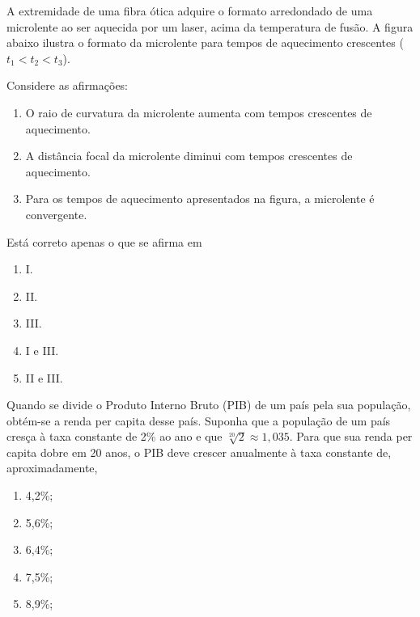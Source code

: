 \documentclass[twocolumn,landscape]{amsart}
\begin{document}
\begin{questao}
  A extremidade de uma fibra ótica adquire o formato arredondado de uma
  microlente ao ser aquecida por um laser, acima da temperatura de
  fusão. A figura abaixo ilustra o formato da microlente para tempos de
  aquecimento crescentes ($t_1<t_2<t_3$).

  Considere as afirmações:

  \begin{enumerate}[\bf I.]
    \item O raio de curvatura da microlente aumenta com
    tempos crescentes de aquecimento.
    \item A distância focal da microlente diminui com tempos
    crescentes de aquecimento.
    \item Para os tempos de aquecimento apresentados na
    figura, a microlente é convergente.
  \end{enumerate}

  Está correto apenas o que se afirma em

  \begin{enumerate}[\bf a.]
    \item I.
    \item II.
    \item III.
    \item I e III.
    \item II e III. %
  \end{enumerate}
\end{questao}
\clearpage

\begin{questao}
  Quando se divide o Produto Interno Bruto (PIB) de um país pela sua
  população, obtém-se a renda per capita desse país. Suponha que a
  população de um país cresça à taxa constante de 2\% ao ano e que
  $\sqrt[20]{2}\approx 1,035$. Para que sua renda per capita dobre em 20
  anos, o PIB deve crescer anualmente à taxa constante de,
  aproximadamente,
  \begin{enumerate}[\bf a.]
    \item 4,2\%;
    \item 5,6\%; %
    \item 6,4\%;
    \item 7,5\%;
    \item 8,9\%;
  \end{enumerate}
\end{questao}
\clearpage
\end{document}
